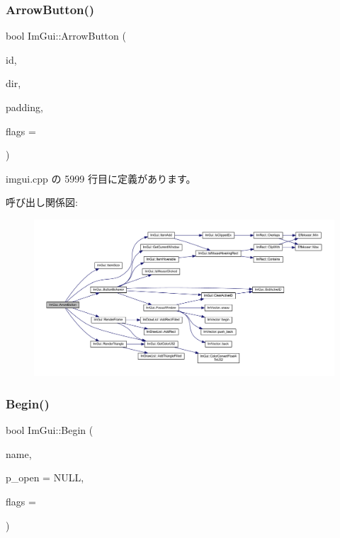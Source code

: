 \subsubsection{\texorpdfstring{Arrow\+Button()}{ArrowButton()}}
{\footnotesize\ttfamily bool Im\+Gui\+::\+Arrow\+Button (\begin{DoxyParamCaption}\item[{\mbox{\hyperlink{imgui_8h_a1785c9b6f4e16406764a85f32582236f}{Im\+Gui\+ID}}}]{id,  }\item[{\mbox{\hyperlink{imgui__internal_8h_a4b8427c5153ae1d43278dc397d809335}{Im\+Gui\+Dir}}}]{dir,  }\item[{\mbox{\hyperlink{struct_im_vec2}{Im\+Vec2}}}]{padding,  }\item[{\mbox{\hyperlink{imgui__internal_8h_a990fae518aa1d95f571ee40989de4c22}{Im\+Gui\+Button\+Flags}}}]{flags = {} }\end{DoxyParamCaption})}



 imgui.\+cpp の 5999 行目に定義があります。

呼び出し関係図\+:\nopagebreak
\begin{figure}[H]
\begin{center}
\leavevmode
\includegraphics[width=350pt]{namespace_im_gui_ac7c2bd67d2bb2d8ee4b583b1576a0bd3_cgraph}
\end{center}
\end{figure}
\mbox{\label{namespace_im_gui_a581e58db0bc930bafa4a5d23093a2b99}} 
\subsubsection{\texorpdfstring{Begin()}{Begin()}\hspace{0.1cm}{\footnotesize\ttfamily [1/2]}}
{\footnotesize\ttfamily bool Im\+Gui\+::\+Begin (\begin{DoxyParamCaption}\item[{const char $\ast$}]{name,  }\item[{bool $\ast$}]{p\+\_\+open = {\ttfamily NULL},  }\item[{\mbox{\hyperlink{imgui_8h_a0b8e067ab4f7a818828c8d89e531addc}{Im\+Gui\+Window\+Flags}}}]{flags = {} }\end{DoxyParamCaption})}



